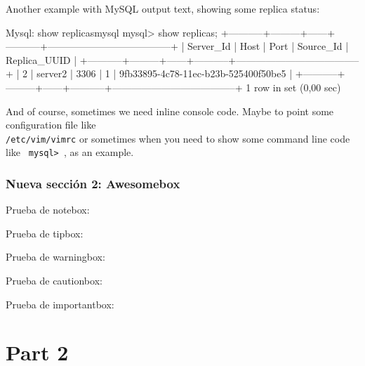 \documentclass{yukibook}
\begin{document}
Another example with MySQL output text, showing some replica status:

\begin{mycode}{Mysql: show replicas}{mysql}{\footnotesize}
mysql> show replicas;
+-----------+---------+------+-----------+--------------------------------------+
| Server_Id | Host    | Port | Source_Id | Replica_UUID                         |
+-----------+---------+------+-----------+--------------------------------------+
|         2 | server2 | 3306 |         1 | 9fb33895-4c78-11ec-b23b-525400f50be5 |
+-----------+---------+------+-----------+--------------------------------------+
1 row in set (0,00 sec)
\end{mycode}

And of course, sometimes we need inline console code. Maybe to point some configuration file like \\ \texttt{/etc/vim/vimrc} or sometimes when you need to show some command line code like \texttt{ mysql> }, as an example.


\section{Nueva sección 2: Awesomebox}
Prueba de notebox:

\notebox{\Blindtext[1]}

Prueba de tipbox:
\tipbox{\Blindtext[1]}

Prueba de warningbox:
\warningbox{\Blindtext[1]}

Prueba de cautionbox:
\cautionbox{\Blindtext[1]}

Prueba de importantbox:
\importantbox{\Blindtext[1]}


\begin{info-box}
  \notebox{\Blindtext[1]}
\end{info-box}
\begin{warning-box}
  \Blindtext[1]
\end{warning-box}
\begin{error-box}
  \Blindtext[1]
\end{error-box}


\part{Part 2}
\Blinddocument

\end{document}
